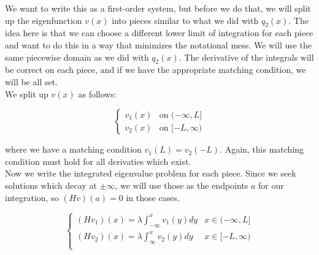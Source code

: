 \documentclass[12pt]{article}
\begin{document}
We want to write this as a first-order system, but before we do that, we will split up the eigenfunction $v(x)$ into pieces similar to what we did with $q_2(x)$. The idea here is that we can choose a different lower limit of integration for each piece and want to do this in a way that minimizes the notational mess. We will use the same piecewise domain as we did with $q_2(x)$. The derivative of the integrals will be correct on each piece, and if we have the appropriate matching condition, we will be all set. \\

We split up $v(x)$ as follows:

\begin{equation}
\begin{cases}
v_1(x) & \text{on } (-\infty, L]  \\
v_2(x) & \text{on } [-L, \infty)
\end{cases}
\end{equation}

where we have a matching condition $v_1(L) = v_2(-L)$. Again, this matching condition must hold for all derivaties which exist. \\

Now we write the integrated eigenvalue problem for each piece. Since we seek solutions which decay at $\pm \infty$, we will use those as the endpoints $a$ for our integration, so $(Hv)(a) = 0$ in those cases.

\begin{equation}
\begin{cases}
(Hv_1)(x) = \lambda \int_{-\infty}^x v_1(y) dy & x \in (-\infty, L] \\
(Hv_2)(x) = \lambda \int_{\infty}^x v_2(y) dy & x \in [-L, \infty) \\ 
\end{cases}
\end{equation}
\end{document}
